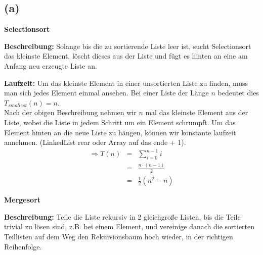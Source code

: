 \documentclass[11pt,a4paper,ngerman]{article}
\begin{document}
\subsection*{(a)}

\begin{description}

\item{\bfseries Selectionsort}

\begin{description}

\item{\bfseries Beschreibung:} Solange bis die zu sortierende Liste leer ist, sucht Selectionsort das kleinste Element, löscht dieses aus der Liste und fügt es hinten an eine am Anfang neu erzeugte Liste an.

\item{\bfseries Laufzeit:} Um das kleinste Element in einer unsortierten Liste zu finden, muss man sich jedes Element einmal ansehen. Bei einer Liste der Länge $n$ bedeutet dies $T_{smallest}(n) = n$.\\
Nach der obigen Beschreibung nehmen wir $n$ mal das kleinste Element aus der Liste, wobei die Liste in jedem Schritt um ein Element schrumpft. Um das Element hinten an die neue Liste zu hängen, können wir konstante laufzeit annehmen. (LinkedList rear oder Array auf das ende + 1).\\
$$
\begin{array}{rcl}
\Rightarrow T(n) &=& \sum_{i=0}^{n-1} i \\
&=& \frac{n\cdot (n-1)}{2} \\
&=& \frac{1}{2} \left( n^2 - n \right)
\end{array}
$$

\end{description}

\item{\bfseries Mergesort}

\begin{description}

\item{\bfseries Beschreibung:} Teile die Liste rekursiv in 2 gleichgroße Listen, bis die Teile trivial zu lösen sind, z.B. bei einem Element, und vereinige danach die sortierten Teillisten auf dem Weg den Rekursionsbaum hoch wieder, in der richtigen Reihenfolge.


\end{description}
\end{description}
\end{document}

